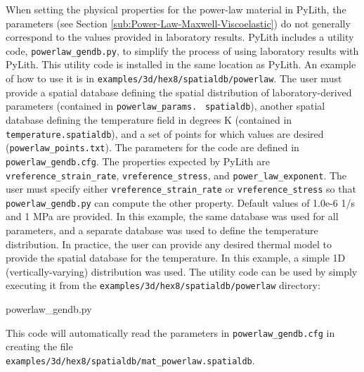 When setting the physical properties for the power-law material in
PyLith, the parameters (see Section \vref{sub:Power-Law-Maxwell-Viscoelastic})
do not generally correspond to the values provided in laboratory results.
PyLith includes a utility code, \texttt{powerlaw\_gendb.py}, to simplify
the process of using laboratory results with PyLith. This utility
code is installed in the same location as PyLith. An example of how
to use it is in \texttt{examples/3d/hex8/spatialdb/powerlaw}. The
user must provide a spatial database defining the spatial distribution
of laboratory-derived parameters (contained in \texttt{powerlaw\_params.}~\linebreak{}
\texttt{spatialdb}), another spatial database defining the temperature
field in degrees K (contained in \texttt{temperature.spatialdb}),
and a set of points for which values are desired (\texttt{powerlaw\_points.txt}).
The parameters for the code are defined in \texttt{powerlaw\_gendb.cfg}.
The properties expected by PyLith are \texttt{vreference\_strain\_rate},
\texttt{vreference\_stress}, and \texttt{power\_law\_exponent}. The
user must specify either \texttt{vreference\_strain\_rate} or \texttt{vreference\_stress}
so that \texttt{powerlaw\_gendb.py} can compute the other property.
Default values of 1.0e-6 1/s and 1 MPa are provided. In this example,
the same database was used for all parameters, and a separate database
was used to define the temperature distribution. In practice, the
user can provide any desired thermal model to provide the spatial
database for the temperature. In this example, a simple 1D (vertically-varying)
distribution was used. The utility code can be used by simply executing
it from the \texttt{examples/3d/hex8/spatialdb/powerlaw} directory:
\begin{lyxcode}
powerlaw\_gendb.py
\end{lyxcode}
This code will automatically read the parameters in \texttt{powerlaw\_gendb.cfg}
in creating the file\\
 \texttt{examples/3d/hex8/spatialdb/mat\_powerlaw.spatialdb}.

